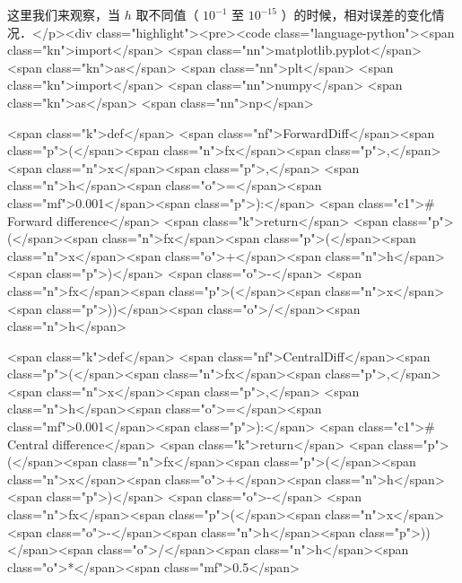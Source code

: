 这里我们来观察，当  $h$  取不同值（ $10^{-1}$  至  $10^{-15}$ ）的时候，相对误差的变化情况．</p><div class="highlight"><pre><code class="language-python"><span class="kn">import</span> <span class="nn">matplotlib.pyplot</span> <span class="kn">as</span> <span class="nn">plt</span>
<span class="kn">import</span> <span class="nn">numpy</span> <span class="kn">as</span> <span class="nn">np</span>

<span class="k">def</span> <span class="nf">ForwardDiff</span><span class="p">(</span><span class="n">fx</span><span class="p">,</span> <span class="n">x</span><span class="p">,</span> <span class="n">h</span><span class="o">=</span><span class="mf">0.001</span><span class="p">):</span>
    <span class="c1"># Forward difference</span>
    <span class="k">return</span> <span class="p">(</span><span class="n">fx</span><span class="p">(</span><span class="n">x</span><span class="o">+</span><span class="n">h</span><span class="p">)</span> <span class="o">-</span> <span class="n">fx</span><span class="p">(</span><span class="n">x</span><span class="p">))</span><span class="o">/</span><span class="n">h</span>

<span class="k">def</span> <span class="nf">CentralDiff</span><span class="p">(</span><span class="n">fx</span><span class="p">,</span> <span class="n">x</span><span class="p">,</span> <span class="n">h</span><span class="o">=</span><span class="mf">0.001</span><span class="p">):</span>
    <span class="c1"># Central difference</span>
    <span class="k">return</span> <span class="p">(</span><span class="n">fx</span><span class="p">(</span><span class="n">x</span><span class="o">+</span><span class="n">h</span><span class="p">)</span> <span class="o">-</span> <span class="n">fx</span><span class="p">(</span><span class="n">x</span><span class="o">-</span><span class="n">h</span><span class="p">))</span><span class="o">/</span><span class="n">h</span><span class="o">*</span><span class="mf">0.5</span>

